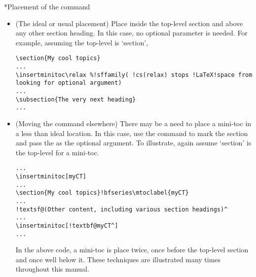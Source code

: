 \documentclass[10pt]{article}
\makeatletter
\renewcommand*{\theparagraph}{\texorpdfstring{\protect\P}{\textparagraph}}
\renewcommand{\paragraph}
    {\renewcommand{\@seccntformat}[1]{\theparagraph\space}%
    \@startsection{paragraph}{4}{0pt}{6pt}{-3pt}{\bfseries}}
\edef\amtIndent{\the\parindent}
\makeatother
\begin{document}
\paragraph*{Placement of the command} \leavevmode
\begin{itemize}
   \item (The ideal or usual placement) Place  inside the top-level
   section and above any other section heading. In this case, no optional parameter is
   needed. For example, assuming the top-level is `section',
\begin{Verbatim}[xleftmargin=\amtIndent,fontsize=\small,commandchars={!()}]
\section{My cool topics}
...
\insertminitoc\relax %!sffamily( !cs(relax) stops !LaTeX!space from looking for optional argument)
...
\subsection{The very next heading}
...
\end{Verbatim}
  \item (Moving the command elsewhere) There may be a need to place a
      mini-toc in a less than ideal location. In this case, use the
       command to mark the section
      and pass the  as the optional argument. To illustrate,
      again assume `section' is the top-level for a mini-toc.
\begin{Verbatim}[xleftmargin=\amtIndent,fontsize=\small,commandchars={!@^}]
...
\insertminitoc[myCT]
...
\section{My cool topics}!bfseries\mtoclabel{myCT}
...
!textsf@(Other content, including various section headings)^
...
\insertminitoc[!textbf@myCT^]
...
\end{Verbatim}
In the above code, a mini-toc is place twice, once before the top-level
section and once well below it. These techniques are illustrated many times
throughout this manual.
\end{itemize}
\end{document}
